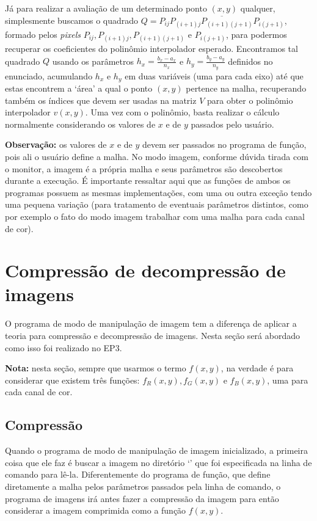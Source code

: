 \documentclass[11pt]{article}
\begin{document}
  Já para realizar a avaliação de um determinado ponto $(x, y)$ qualquer, simplesmente buscamos o quadrado $Q = \overline{P_{ij}P_{(i+1)j}P_{(i+1)(j+1)}P_{i(j+1)}}$, formado pelos
  \textit{pixels} $P_{ij}, P_{(i+1)j}, P_{(i+1)(j+1)}$ e $P_{i(j+1)}$, para podermos recuperar os coeficientes do polinômio interpolador esperado. Encontramos tal quadrado $Q$ usando os
  parâmetros $h_x = \frac{b_x - a_x}{n_x}$ e $h_y = \frac{b_y - a_y}{n_y}$ definidos no enunciado, acumulando $h_x$ e $h_y$ em duas variáveis (uma para cada eixo) até que estas encontrem
  a `área' a qual o ponto $(x, y)$ pertence na malha, recuperando também os índices que devem ser usadas na matriz $V$ para obter o polinômio interpolador $v(x, y)$. Uma vez com o polinômio,
  basta realizar o cálculo normalmente considerando os valores de $x$ e de $y$ passados pelo usuário.

  \textbf{Observação:} os valores de $x$ e de $y$ devem ser passados no programa de função, pois ali
  o usuário define a malha. No modo imagem, conforme dúvida tirada com o monitor, a imagem é a própria malha e seus parâmetros são descobertos durante a execução. É importante ressaltar aqui que
  as funções de ambos os programas possuem as mesmas implementações, com uma ou outra exceção tendo uma pequena variação (para tratamento de eventuais parâmetros distintos, como por exemplo
  o fato do modo imagem trabalhar com uma malha para cada canal de cor).


  \section{Compressão de decompressão de imagens}

  \indent\indent O programa de modo de manipulação de imagem tem a diferença de aplicar a teoria para compressão e decompressão de imagens. Nesta seção será abordado
  como isso foi realizado no EP3.

  \textbf{Nota:} nesta seção, sempre que usarmos o termo $f(x, y)$, na verdade é para considerar que existem
  três funções: $f_R(x, y), f_G(x, y)$ e $f_B(x, y)$, uma para cada canal de cor.

  \subsection{Compressão}

  \indent\indent Quando o programa de modo de manipulação de imagem inicializado, a primeira coisa que ele faz é buscar a imagem no diretório `{}' que foi especificada
  na linha de comando para lê-la. Diferentemente do programa de função, que define diretamente a malha pelos parâmetros passados pela linha de comando, o programa de imagens irá antes fazer
  a compressão da imagem para então considerar a imagem comprimida como a função $f(x, y)$.
\end{document}
